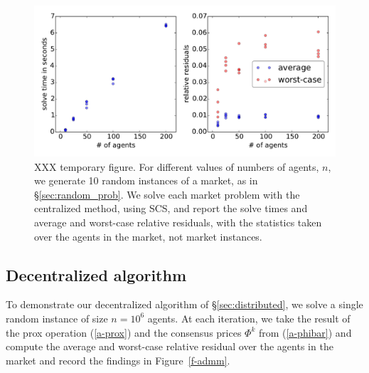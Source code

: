 \documentclass[12pt]{article}
\begin{document}
\begin{figure}
\begin{center}
\includegraphics[width=1.0\textwidth]{figures/cvxpy}
\end{center}
\caption{XXX temporary figure. For different values of numbers of agents, $n$,
we generate 10 random instances of a market, as in \S\ref{sec:random_prob}.
We solve each market problem with the centralized method, using SCS, and
report the solve times and average and worst-case relative residuals, with the
statistics taken over the agents in the market, not market instances.}
\label{f-cvxpy}
\end{figure}


\subsection{Decentralized algorithm}
\label{sec:distributed_examples}
To demonstrate our decentralized algorithm of \S\ref{sec:distributed},
we solve a single random instance of size $n=10^6$ agents. At each iteration,
we take the result of the prox operation (\ref{a-prox}) and the consensus
prices $\Phi^k$ from (\ref{a-phibar}) and compute the average and worst-case
relative residual over the agents in the market and record the findings in
Figure~\ref{f-admm}.
\end{document}
